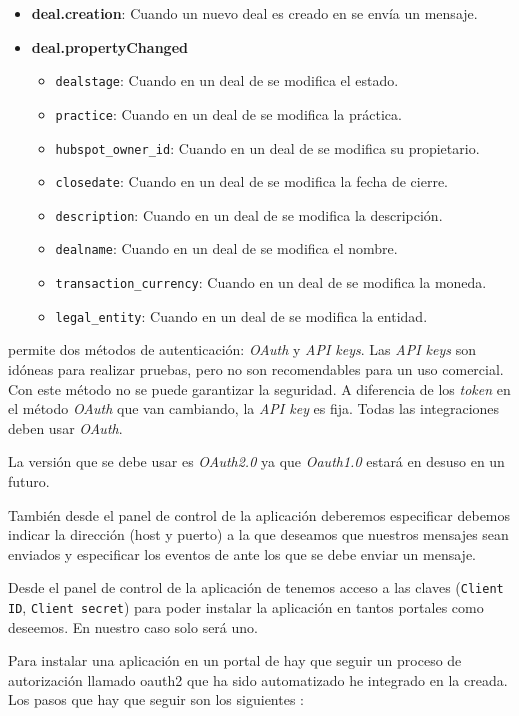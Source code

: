 \begin{itemize}
	\item \textbf{deal.creation}: Cuando un nuevo deal es creado en \hs{} se envía un mensaje.
	\item \textbf{deal.propertyChanged} 
		\begin{itemize}
			\item \verb|dealstage|: Cuando en un deal de \hs{} se modifica el estado.
			\item \verb|practice|: Cuando en un deal de \hs{} se modifica la práctica.
			\item \verb|hubspot_owner_id|: Cuando en un deal de \hs{} se modifica su propietario.
			\item \verb|closedate|: Cuando en un deal de \hs{} se modifica la fecha de cierre.
			\item \verb|description|: Cuando en un deal de \hs{} se modifica la descripción.
			\item \verb|dealname|: Cuando en un deal de \hs{} se modifica el nombre.
			\item \verb|transaction_currency|: Cuando en un deal de \hs{} se modifica la moneda.
			\item \verb|legal_entity|: Cuando en un deal de \hs{} se modifica la entidad.
		\end{itemize}
\end{itemize}

\hs{} permite dos métodos de autenticación: \textit{OAuth} y \textit{API keys}. Las \textit{API keys} son idóneas para realizar pruebas, pero no son recomendables para un uso comercial. Con este método no se puede garantizar la seguridad. A diferencia de los \textit{token} en el método \textit{OAuth} que van cambiando, la \textit{API key} es fija. Todas las integraciones deben usar \textit{OAuth}.

La versión que se debe usar es \textit{OAuth2.0} ya que \textit{Oauth1.0} estará en desuso en un futuro.

También desde el panel de control de la aplicación deberemos especificar debemos indicar la dirección (host y puerto) a la que deseamos que nuestros mensajes sean enviados y especificar los eventos de \hs{} ante los que se debe enviar un mensaje.

Desde el panel de control de la aplicación de \hs{} tenemos acceso a las claves (\texttt{Client ID}, \texttt{Client secret}) para poder instalar la aplicación en tantos portales como deseemos. En nuestro caso solo será uno.


Para instalar una aplicación en un portal de \hs{} hay que seguir un proceso de autorización llamado \gls{oauth2} que ha sido automatizado he integrado en la \iface{} creada. 
Los pasos que hay que seguir son los siguientes \cite{hsapi}:

